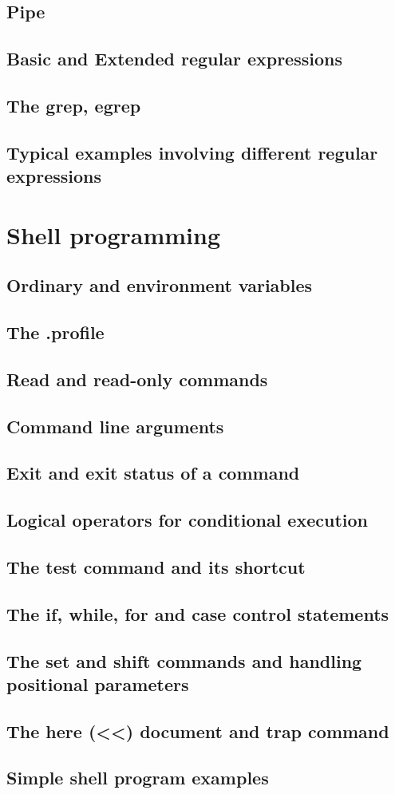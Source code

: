 \documentclass{article}
\begin{document}
	\subsection{Pipe}
	\subsection{Basic and Extended regular expressions}
	\subsection{The grep, egrep}
	\subsection{Typical examples involving different regular expressions}
	
	\section{Shell programming}
	\subsection{Ordinary and environment variables}
	\subsection{The .profile}
	\subsection{Read and read-only commands}
	\subsection{Command line arguments}
	\subsection{Exit and exit status of a command}
	\subsection{Logical operators for conditional execution}
	\subsection{The test command and its shortcut}
	\subsection{The if, while, for and case control statements}
	\subsection{The set and shift commands and handling positional parameters}
	\subsection{The here (<<) document and trap command}
	\subsection{Simple shell program examples}
\end{document}
